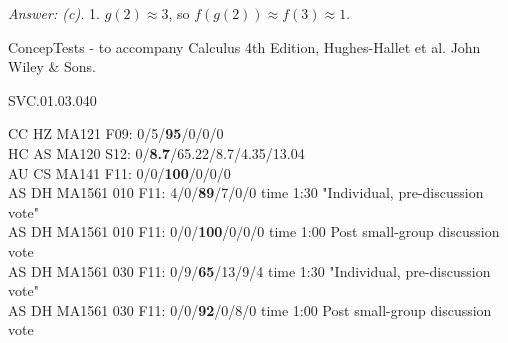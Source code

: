 {\it Answer: (c).} 1.  $g(2) \approx 3$, so $f(g(2)) \approx f(3) \approx 1$.

\medskip
ConcepTests - to accompany Calculus 4th Edition, Hughes-Hallet et al. John Wiley \& Sons.

SVC.01.03.040


CC HZ MA121 F09: 0/5/{\bf95}/0/0/0  \\
HC AS MA120 S12: 0/{\bf8.7}/65.22/8.7/4.35/13.04  \\
AU CS MA141 F11: 0/0/{\bf100}/0/0/0  \\
AS DH MA1561 010 F11: 4/0/{\bf89}/7/0/0 time 1:30 "Individual, pre-discussion vote" \\
AS DH MA1561 010 F11: 0/0/{\bf100}/0/0/0 time 1:00 Post small-group discussion vote \\
AS DH MA1561 030 F11: 0/9/{\bf65}/13/9/4 time 1:30 "Individual, pre-discussion vote" \\
AS DH MA1561 030 F11: 0/0/{\bf92}/0/8/0 time 1:00 Post small-group discussion vote \\
